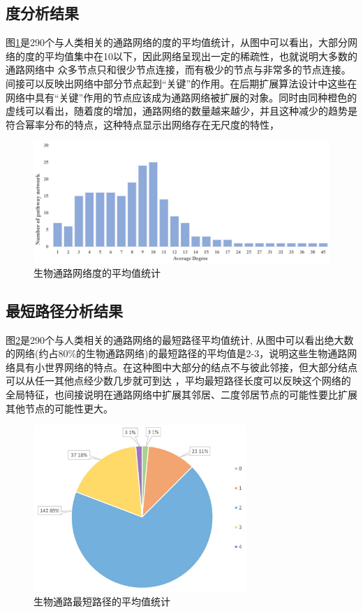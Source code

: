 \subsection{度分析结果}
图\ref{fig26}是290个与人类相关的通路网络的度的平均值统计，从图中可以看出，大部分网络的度的平均值集中在10以下，因此网络呈现出一定的稀疏性，也就说明大多数的通路网络中 众多节点只和很少节点连接，而有极少的节点与非常多的节点连接。间接可以反映出网络中部分节点起到“关键”的作用。在后期扩展算法设计中这些在网络中具有“关键”作用的节点应该成为通路网络被扩展的对象。同时由同种橙色的虚线可以看出，随着度的增加，通路网络的数量越来越少，并且这种减少的趋势是符合幂率分布的特点，这种特点显示出网络存在无尺度的特性，

\begin{figure}[h]
\centering
\includegraphics[width = 1\textwidth]{degree_dis}
\caption[fig26]{生物通路网络度的平均值统计}
\label{fig26}
\end{figure}

\subsection{最短路径分析结果}
图\ref{fig27}是290个与人类相关的通路网络的最短路径平均值统计, 从图中可以看出绝大数的网络(约占80\%的生物通路网络)的最短路径的平均值是2-3，说明这些生物通路网络具有小世界网络\cite{amaral2000classes}的特点。在这种图中大部分的结点不与彼此邻接，但大部分结点可以从任一其他点经少数几步就可到达 ，平均最短路径长度可以反映这个网络的全局特征，也间接说明在通路网络中扩展其邻居、二度邻居节点的可能性要比扩展其他节点的可能性更大。

\begin{figure}[h]
\centering
\includegraphics[width = 0.72\textwidth]{pie}
\caption[fig27]{生物通路最短路径的平均值统计}
\label{fig27}
\end{figure}

